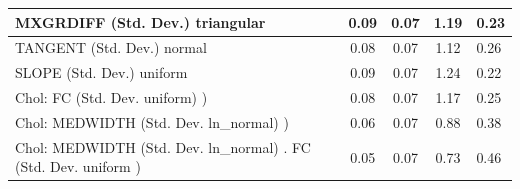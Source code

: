 \begin{table}
\begin{center}
\begin{tabular}{|l|l|c|c|c|l|}
			\hline
			MXGRDIFF (Std. Dev.) triangular &  & 0.09 & 0.07 & 1.19 & 0.23 \\
			\hline
			TANGENT (Std. Dev.) normal &  & 0.08 & 0.07 & 1.12 & 0.26 \\
			\hline
			SLOPE (Std. Dev.) uniform &  & 0.09 & 0.07 & 1.24 & 0.22 \\
			\hline
			 Chol: FC (Std. Dev. uniform) ) &  & 0.08 & 0.07 & 1.17 & 0.25 \\
			\hline
			 Chol: MEDWIDTH (Std. Dev. ln_normal) ) &  & 0.06 & 0.07 & 0.88 & 0.38 \\
			\hline
			 Chol: MEDWIDTH (Std. Dev. ln_normal) . FC (Std. Dev.   uniform ) &  & 0.05 & 0.07 & 0.73 & 0.46 \\
			\hline
		\end{tabular}
	\end{center}
\end{table}
